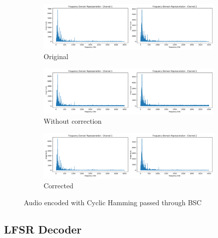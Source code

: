 \documentclass{article}
\begin{document}
\begin{figure}
    \centering
    \begin{subfigure}[b]{\textwidth}
        \centering
        \includegraphics[width=\textwidth]{../Result/wav-frequency-domain-TX.png}
        \caption{Original}
        \label{fig:f-audio-cyclic-bsc-original}
    \end{subfigure}
    \begin{subfigure}[b]{\textwidth}
        \centering
        \includegraphics[width=\textwidth]{../Result/cyclic-bsc-wav-frequency-domain-RX.png}
        \caption{Without correction}
        \label{fig:f-audio-cyclic-bsc-no-correction}
    \end{subfigure}
    \begin{subfigure}[b]{\textwidth}
        \centering
        \includegraphics[width=\textwidth]{../Result/cyclic-bsc-wav-frequency-domain-RX-syndrome-corrected.png}
        \caption{Corrected}
        \label{fig:f-audio-cyclic-bsc-syndrome-corrected}
    \end{subfigure}
       \caption{Audio encoded with Cyclic Hamming passed through BSC}
       \label{fig:f-audio-cyclic-bsc}
\end{figure}






\subsection{LFSR Decoder}
\end{document}
